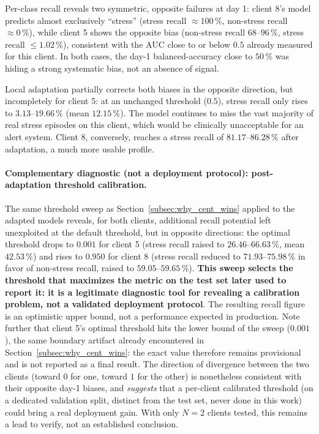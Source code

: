 \documentclass{article}
\begin{document}
Per-class recall reveals two symmetric, opposite failures at day 1: client 8's
model predicts almost exclusively ``stress'' (stress recall $\approx 100\,\%$,
non-stress recall $\approx 0\,\%$), while client 5 shows the opposite bias
(non-stress recall $68$--$96\,\%$, stress recall $\leq 1.02\,\%$), consistent with
the AUC close to or below $0.5$ already measured for this client. In both cases,
the day-1 balanced-accuracy close to $50\,\%$ was hiding a strong systematic bias,
not an absence of signal.

Local adaptation partially corrects both biases in the opposite direction, but
incompletely for client 5: at an unchanged threshold ($0.5$), stress recall only
rises to $3.13$--$19.66\,\%$ (mean $12.15\,\%$). The model continues to miss the
vast majority of real stress episodes on this client, which would be clinically
unacceptable for an alert system. Client 8, conversely, reaches a stress recall of
$81.17$--$86.28\,\%$ after adaptation, a much more usable profile.

\paragraph{Complementary diagnostic (not a deployment protocol): post-adaptation
threshold calibration.} The same threshold sweep as Section~\ref{subsec:why_cent_wins}
applied to the adapted models reveals, for both clients, additional recall
potential left unexploited at the default threshold, but in opposite directions:
the optimal threshold drops to $0.001$ for client 5 (stress recall raised to
$26.46$--$66.63\,\%$, mean $42.53\,\%$) and rises to $0.950$ for client 8 (stress
recall reduced to $71.93$--$75.98\,\%$ in favor of non-stress recall, raised to
$59.05$--$59.65\,\%$). \textbf{This sweep selects the threshold that maximizes the
metric on the test set later used to report it: it is a legitimate diagnostic
tool for revealing a calibration problem, not a validated deployment protocol}.
The resulting recall figure is an optimistic upper bound, not a performance
expected in production. Note further that client 5's optimal threshold hits the
lower bound of the sweep ($0.001$), the same boundary artifact already
encountered in Section~\ref{subsec:why_cent_wins}: the exact value therefore
remains provisional and is not reported as a final result. The direction of
divergence between the two clients (toward $0$ for one, toward $1$ for the other)
is nonetheless consistent with their opposite day-1 biases, and \emph{suggests}
that a per-client calibrated threshold (on a dedicated validation split, distinct
from the test set, never done in this work) could bring a real deployment gain.
With only $N=2$ clients tested, this remains a lead to verify, not an established
conclusion.
\end{document}
